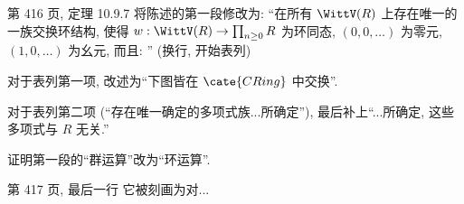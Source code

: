 \documentclass{AJerrata}
\begin{document}
\begin{Errata}
        \item[第 416 页, 定理 10.9.7]
        将陈述的第一段修改为: ``在所有 $\WittV(R)$ 上存在唯一的一族交换环结构, 使得 $w: \WittV(R) \to \prod_{n \geq 0} R$ 为环同态, $(0, 0, \ldots)$ 为零元, $(1, 0, \ldots)$ 为幺元, 而且: '' (换行, 开始表列)
        
        对于表列第一项, 改述为``下图皆在 $\cate{CRing}$ 中交换''.
        
        对于表列第二项 (``存在唯一确定的多项式族...所确定''), 最后补上``...所确定, 这些多项式与 $R$ 无关.''
        
        证明第一段的``群运算''改为``环运算''.

        \item[第 417 页, 最后一行] 它被刻画为对...
	\end{Errata}
\end{document}
